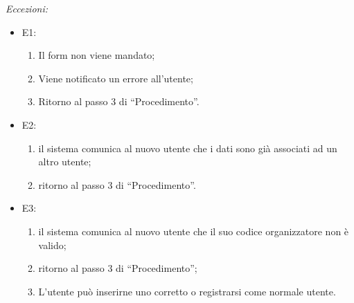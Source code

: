\textit{Eccezioni:}
\begin{itemize}
  \item E1:
  \begin{enumerate}
    \item Il form non viene mandato;
    \item Viene notificato un errore all'utente;
    \item Ritorno al passo 3 di ``Procedimento''.
	\end{enumerate}
	\item E2:
	\begin{enumerate}
		\item il sistema comunica al nuovo utente che i dati sono già associati ad un altro utente;
		\item ritorno al passo 3 di ``Procedimento''.
	\end{enumerate}
  \item E3:
	\begin{enumerate}
		\item il sistema comunica al nuovo utente che il suo codice organizzatore non è valido;
		\item ritorno al passo 3 di ``Procedimento'';
		\item L'utente può inserirne uno corretto o registrarsi come normale utente.
	\end{enumerate}
\end{itemize}
